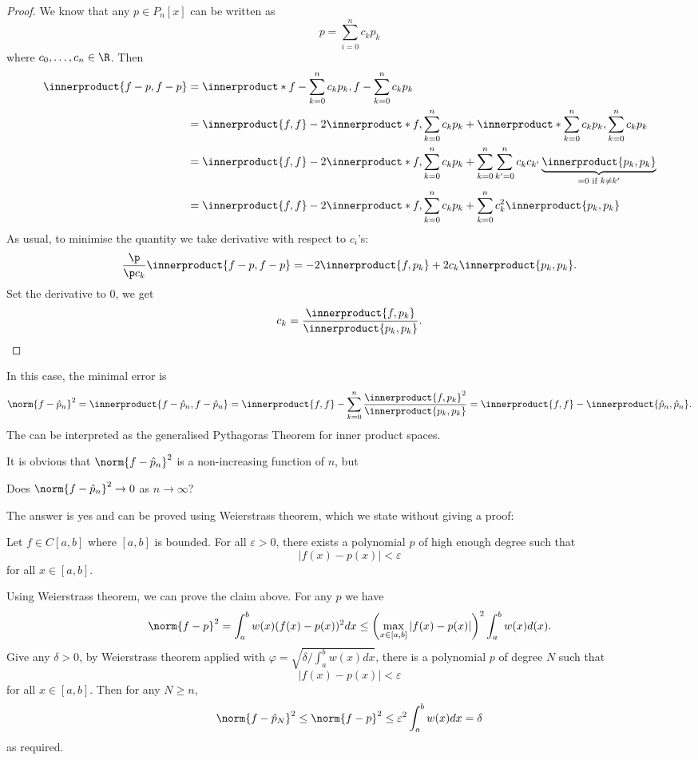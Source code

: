 \documentclass[a4paper]{article}
\newcommand*{\inner}{\innerproduct}
\begin{document}
\begin{proof}
  We know that any \(p \in P_n[x]\) can be written as
  \[
    p = \sum_{i = 0}^n c_kp_k
  \]
  where \(c_0, \dots, c_n \in \R\). Then
  \begin{align*}
    \inner{f - p, f - p} &= \inner*{f - \sum_{k = 0}^n c_kp_k, f - \sum_{k = 0}^n c_kp_k} \\
                         &= \inner{f, f} - 2\inner*{f, \sum_{k = 0}^n c_kp_k} + \inner*{\sum_{k = 0}^n c_kp_k, \sum_{k = 0}^n c_kp_k} \\
                         &= \inner{f, f} - 2\inner*{f, \sum_{k = 0}^n c_kp_k} + \sum_{k = 0}^n \sum_{k' = 0}^n c_kc_{k'}\underbrace{\inner{p_k, p_k}}_{= 0 \text{ if } k \neq k'} \\
                         &= \inner{f, f} - 2\inner*{f, \sum_{k = 0}^n c_kp_k} + \sum_{k = 0}^n c_k^2 \inner{p_k, p_k}
  \end{align*}
  As usual, to minimise the quantity we take derivative with respect to \(c_i\)'s:
  \[
    \frac{\p}{\p c_k} \inner{f - p, f - p} = -2 \inner{f, p_k}  + 2c_k \inner{p_k, p_k}.
  \]
  Set the derivative to \(0\), we get
  \[
    c_k = \frac{\inner{f, p_k}}{\inner{p_k, p_k}}.
  \]
\end{proof}

In this case, the minimal error is
\[
  \norm{f - \hat p_n}^2 = \inner{f - \hat p_n, f - \hat p_n} = \inner{f, f} - \sum_{k = 0}^n \frac{\inner{f, p_k}^2}{\inner{p_k, p_k}} = \inner{f, f} - \inner{\hat p_n, \hat p_n}.
\]
The can be interpreted as the generalised Pythagoras Theorem for inner product spaces.

It is obvious that \(\norm{f - \hat p_n}^2\) is a non-increasing function of \(n\), but
\begin{question}
  Does \(\norm{f - \hat p_n}^2 \to 0\) as \(n \to \infty\)?
\end{question}

The answer is yes and can be proved using Weierstrass theorem, which we state without giving a proof:

\begin{theorem}[Weierstrass]
  Let \(f \in C[a, b]\) where \([a, b]\) is bounded. For all \(\varepsilon > 0\), there exists a polynomial \(p\) of high enough degree such that
  \[
    |f(x) - p(x)| < \varepsilon
  \]
  for all \(x \in [a, b]\).
\end{theorem}

Using Weierstrass theorem, we can prove the claim above. For any \(p\) we have
\[
  \norm{f - p}^2 = \int_a^b w(x)(f(x) - p(x))^2 dx \leq \left(\max_{x \in [a, b]} |f(x) - p(x)| \right)^2 \int_a^b w(x) d(x).
\]
Give any \(\delta > 0\), by Weierstrass theorem applied with \(\varphi = \sqrt{\delta/\int_a^b w(x) dx}\), there is a polynomial \(p\) of degree \(N\) such that
\[
  |f(x) - p(x)| < \varepsilon
\]
for all \(x \in [a, b]\). Then for any \(N \geq n\),
\[
  \norm{f - \hat p_N}^2 \leq \norm{f - p}^2 \leq \varepsilon^2 \int_a^b w(x) dx = \delta
\]
as required.
\end{document}
